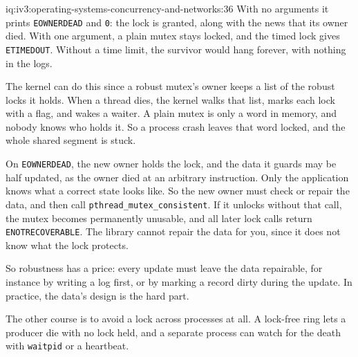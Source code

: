 \begin{solution}{iq:iv3:operating-systems-concurrency-and-networks:36}
With no arguments it prints \texttt{EOWNERDEAD} and \texttt{0}: the lock is granted, along with the news that its owner died. With one argument, a plain mutex stays locked, and the timed lock gives \texttt{ETIMEDOUT}. Without a time limit, the survivor would hang forever, with nothing in the logs.

The kernel can do this since a robust mutex's owner keeps a list of the robust locks it holds. When a thread dies, the kernel walks that list, marks each lock with a flag, and wakes a waiter. A plain mutex is only a word in memory, and nobody knows who holds it. So a process crash leaves that word locked, and the whole shared segment is stuck.

On \texttt{EOWNERDEAD}, the new owner holds the lock, and the data it guards may be half updated, as the owner died at an arbitrary instruction. Only the application knows what a correct state looks like. So the new owner must check or repair the data, and then call \texttt{pthread\_mutex\_consistent}. If it unlocks without that call, the mutex becomes permanently unusable, and all later lock calls return \texttt{ENOTRECOVERABLE}. The library cannot repair the data for you, since it does not know what the lock protects.

So robustness has a price: every update must leave the data repairable, for instance by writing a log first, or by marking a record dirty during the update. In practice, the data's design is the hard part.

The other course is to avoid a lock across processes at all. A lock-free ring lets a producer die with no lock held, and a separate process can watch for the death with \texttt{waitpid} or a heartbeat.

\end{solution}

